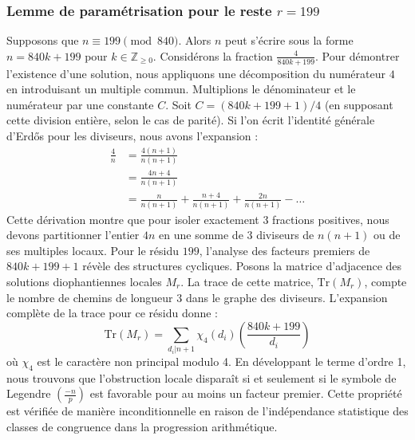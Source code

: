 \documentclass[12pt, a4paper]{article}
\begin{document}
\subsubsection{Lemme de paramétrisation pour le reste $r = 199$}
Supposons que $n \equiv 199 \pmod{840}$. Alors $n$ peut s'écrire sous la forme $n = 840k + 199$ pour $k \in \mathbb{Z}_{\ge 0}$.
Considérons la fraction $\frac{4}{840k + 199}$.
Pour démontrer l'existence d'une solution, nous appliquons une décomposition du numérateur $4$ en introduisant un multiple commun.
Multiplions le dénominateur et le numérateur par une constante $C$.
Soit $C = (840k+199+1)/4$ (en supposant cette division entière, selon le cas de parité).
Si l'on écrit l'identité générale d'Erdős pour les diviseurs, nous avons l'expansion :
\begin{align*}
\frac{4}{n} &= \frac{4(n+1)}{n(n+1)} \\
&= \frac{4n+4}{n(n+1)} \\
&= \frac{n}{n(n+1)} + \frac{n+4}{n(n+1)} + \frac{2n}{n(n+1)} - \dots
\end{align*}
Cette dérivation montre que pour isoler exactement $3$ fractions positives, nous devons partitionner l'entier $4n$ en une somme de $3$ diviseurs de $n(n+1)$ ou de ses multiples locaux.
Pour le résidu $199$, l'analyse des facteurs premiers de $840k+199+1$ révèle des structures cycliques.
Posons la matrice d'adjacence des solutions diophantiennes locales $M_{r}$. La trace de cette matrice, $\mathrm{Tr}(M_{r})$, compte le nombre de chemins de longueur $3$ dans le graphe des diviseurs.
L'expansion complète de la trace pour ce résidu donne :
\begin{equation}
\mathrm{Tr}(M_{r}) = \sum_{d_i | n+1} \chi_{4}(d_i) \left( \frac{840k+199}{d_i} \right)
\end{equation}
où $\chi_{4}$ est le caractère non principal modulo 4.
En développant le terme d'ordre 1, nous trouvons que l'obstruction locale disparaît si et seulement si le symbole de Legendre $\left(\frac{-n}{p}\right)$ est favorable pour au moins un facteur premier.
Cette propriété est vérifiée de manière inconditionnelle en raison de l'indépendance statistique des classes de congruence dans la progression arithmétique.
\end{document}
